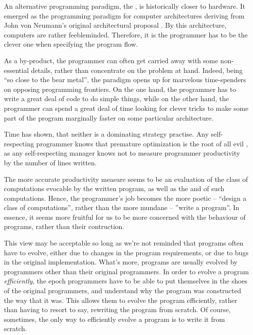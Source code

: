 An alternative programming paradigm, the , is historically
closer to hardware. It emerged as the programming paradigm for computer
architectures deriving from John von Neumann's original architectural proposal
\cite{von-neumann}. By this architecture, computers are rather feebleminded.
Therefore, it is the programmer has to be the clever one when specifying the
program flow.

As a by-product, the programmer can often get carried away with some
non-essential details, rather than concentrate on the problem at hand. Indeed,
being ``so close to the bear metal'', the paradigm opens up for marvelous
time-spenders on opposing programming frontiers. On the one hand, the
programmer has to write a great deal of code to do simple things, while on the
other hand, the programmer can spend a great deal of time looking for clever
tricks to make some part of the program marginally faster on some particular
architecture.

Time has shown, that neither is a dominating strategy practise. Any
self-respecting programmer knows that premature optimization is the root of all
evil \cite{knuth-goto}, as any self-respecting manager knows not to measure
programmer productivity by the number of lines written.


The more accurate productivity measure seems to be an evaluation of the class
of computations evocable by the written program, as well as the  and
  of such computations. Hence, the programmer's
job becomes the more poetic -- ``design a class of computations'', rather than
the more mundane -- ''write a program''. In essence, it seems more fruitful for
us to be more concerned with the behaviour of programs, rather than their
contruction.

This view may be acceptable so long as we're not reminded that programs often
have to evolve, either due to changes in the program requirements, or due to
bugs in the original implementation. What's more, programs are usually evolved
by programmers other than their original programmers. In order to evolve a
program \emph{efficiently}, the epoch programmers have to be able to put
themselves in the shoes of the original programmers, and understand why the
program was constructed the way that it was.  This allows them to evolve the
program efficiently, rather than having to resort to say, rewriting the program
from scratch. Of course, sometimes, the only way to efficiently evolve a
program is to write it from scratch. 

